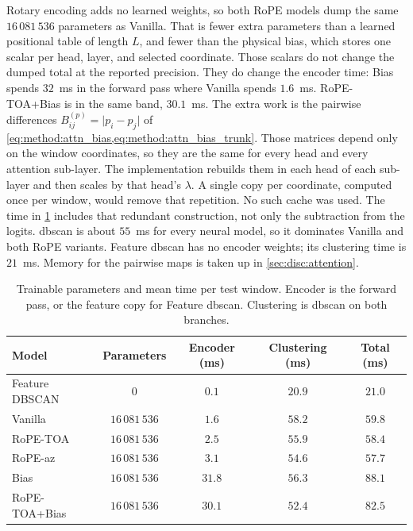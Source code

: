 Rotary encoding adds no learned weights, so both RoPE models dump the same $16\,081\,536$ parameters as Vanilla.
That is fewer extra parameters than a learned positional table of length $L$, and fewer than the physical bias, which stores one scalar per head, layer, and selected coordinate.
Those scalars do not change the dumped total at the reported precision.
They do change the encoder time: Bias spends $32$~ms in the forward pass where Vanilla spends $1.6$~ms.
RoPE-TOA+Bias is in the same band, $30.1$~ms.
The extra work is the pairwise differences $B^{(p)}_{ij}=\lvert p_i-p_j\rvert$ of \cref{eq:method:attn_bias,eq:method:attn_bias_trunk}.
Those matrices depend only on the window coordinates, so they are the same for every head and every attention sub-layer.
The implementation rebuilds them in each head of each sub-layer and then scales by that head's $\lambda$.
A single copy per coordinate, computed once per window, would remove that repetition.
No such cache was used.
The time in \cref{tab:exp:efficiency} includes that redundant construction, not only the subtraction from the logits.
\Gls{dbscan} is about $55$~ms for every neural model, so it dominates Vanilla and both RoPE variants.
Feature \gls{dbscan} has no encoder weights; its clustering time is $21$~ms.
Memory for the pairwise maps is taken up in \cref{sec:disc:attention}.

\begin{table}[tbp]
  \centering
  \caption{Trainable parameters and mean time per test window. Encoder is the forward pass, or the feature copy for Feature \gls{dbscan}. Clustering is \gls{dbscan} on both branches.}
  \label{tab:exp:efficiency}
  \begin{tabular}{@{}lcccc@{}}
    \toprule
    Model & Parameters & Encoder (ms) & Clustering (ms) & Total (ms) \\
    \midrule
    Feature DBSCAN & $0$ & $0.1$ & $20.9$ & $21.0$ \\
    Vanilla   & $16\,081\,536$ & $1.6$ & $58.2$ & $59.8$ \\
    RoPE-TOA  & $16\,081\,536$ & $2.5$ & $55.9$ & $58.4$ \\
    RoPE-az   & $16\,081\,536$ & $3.1$ & $54.6$ & $57.7$ \\
    Bias      & $16\,081\,536$ & $31.8$ & $56.3$ & $88.1$ \\
    RoPE-TOA+Bias & $16\,081\,536$ & $30.1$ & $52.4$ & $82.5$ \\
    \bottomrule
  \end{tabular}
\end{table}

